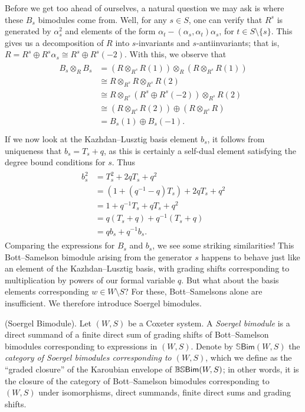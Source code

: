 \noindent Before we get too ahead of ourselves, a natural question we may ask is where these $B_s$ bimodules come from. Well, for any $s \in S$, one can verify that $R^s$ is generated by $\alpha_s^2$ and elements of the form $\alpha_t - (\alpha_s, \alpha_t)\alpha_s$, for $t \in S \setminus \{s\}$. This gives us a decomposition of $R$ into $s$-invariants and $s$-antiinvariants; that is, $R = R^s \oplus R^s \alpha_s \cong R^s \oplus R^s(-2)$. With this, we observe that
\begin{align*}
\begin{split}
B_s \otimes_R B_s &= (R \otimes_{R^s} R(1)) \otimes_R (R \otimes_{R^s} R(1))\\
&\cong R \otimes_{R^s} R \otimes_{R^s} R(2)\\
&\cong R \otimes_{R^s} (R^s \oplus R^s(-2)) \otimes_{R^s} R(2)\\
&\cong (R \otimes_{R^s} R(2)) \oplus (R \otimes_{R^s} R)\\
&= B_s(1) \oplus B_s(-1).\\
\end{split}
\end{align*}
\noindent If we now look at the Kazhdan--Lusztig basis element $b_s$, it follows from uniqueness that $b_s = T_s + q$, as this is certainly a self-dual element satisfying the degree bound conditions for $s$. Thus
\begin{align*}
\begin{split}
b_s^2 &= T_s^2 + 2qT_s + q^2\\
&= (1 + (q^{-1} - q)T_s) + 2qT_s + q^2\\
&= 1 + q^{-1}T_s + qT_s + q^2\\
&= q(T_s + q) + q^{-1}(T_s + q)\\
&= qb_s + q^{-1}b_s.
\end{split}
\end{align*}
\noindent Comparing the expressions for $B_s$ and $b_s$, we see some striking similarities! This Bott--Samelson bimodule arising from the generator $s$ happens to behave just like an element of the Kazhdan--Lusztig basis, with grading shifts corresponding to multiplication by powers of our formal variable $q$. But what about the basis elements corresponding $w \in W\setminus S$? For these, Bott--Samelsons alone are insufficient. We therefore introduce Soergel bimodules.\\

\noindent\begin{definition}\textnormal{(Soergel Bimodule).} Let $(W, S)$ be a Coxeter system. A {\em Soergel bimodule} is a direct summand of a finite direct sum of grading shifts of Bott--Samelson bimodules corresponding to expressions in $(W, S)$. Denote by $\mathbb{S}\textsf{Bim}(W, S)$ the {\em category of Soergel bimodules corresponding to $(W, S)$}, which we define as the ``graded closure'' of the Karoubian envelope of $\mathbb{BS}\textnormal{\textsf{Bim}}(W, S)$; in other words, it is the closure of the category of Bott--Samelson bimodules corresponding to $(W, S)$ under isomorphisms, direct summands, finite direct sums and grading shifts.\\
\end{definition}

